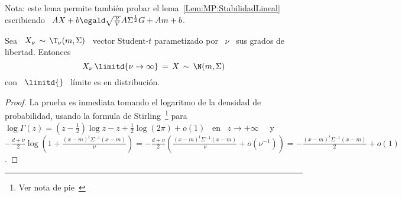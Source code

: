 %
Nota: este  lema permite tambi\'en  probar el lema~\ref{Lem:MP:StabilidadLineal}
escribiendo \ $A X + b \egald  \sqrt{\frac{\nu}{V}} A \Sigma^{\frac12} G + A m +
b$.

\begin{lema}
\label{Lem:MP:LimiteStudentTGaussiana}
%
  Sea \ $X_\nu \, \sim \, \T_\nu(m,\Sigma)$ \ vector Student-$t$ parametizado por
  \ $\nu$ \ sus grados de libertad. Entonces
  \[
  X_\nu \, \limitd{\nu \to \infty} \, = \, X \, \sim \, \N(m,\Sigma)
  \]
  con \ $\displaystyle \limitd{}$ \ l\'imite es en distribuci\'on.
\end{lema}
\begin{proof}
  La prueba  es inmediata tomando el  logaritmo de la  densidad de probabilidad,
  usando      la     formula      de     Stirling~\footnote{Ver      nota     de
    pie~} para  \ $\log\Gamma(z) = \left(  z - \frac12
  \right)  \log  z  -  z  +  \frac12   \log(2  \pi)  +  o(1)$  \  en  \  $z  \to
  +\infty$~\cite{Sti30, AbrSte70, GraRyz15} \ y \ $-\frac{d+\nu}{2} \log\left( 1
    +  \frac{(x-m)^t \Sigma^{-1} (x-m)}{\nu}  \right) =  -\frac{d+\nu}{2} \left(
    \frac{(x-m)^t \Sigma^{-1} (x-m)}{\nu} + o\left( \nu^{-1} \right) \right) = -
  \frac{(x-m)^t \Sigma^{-1} (x-m)}{2} + o(1)$.
\end{proof}

